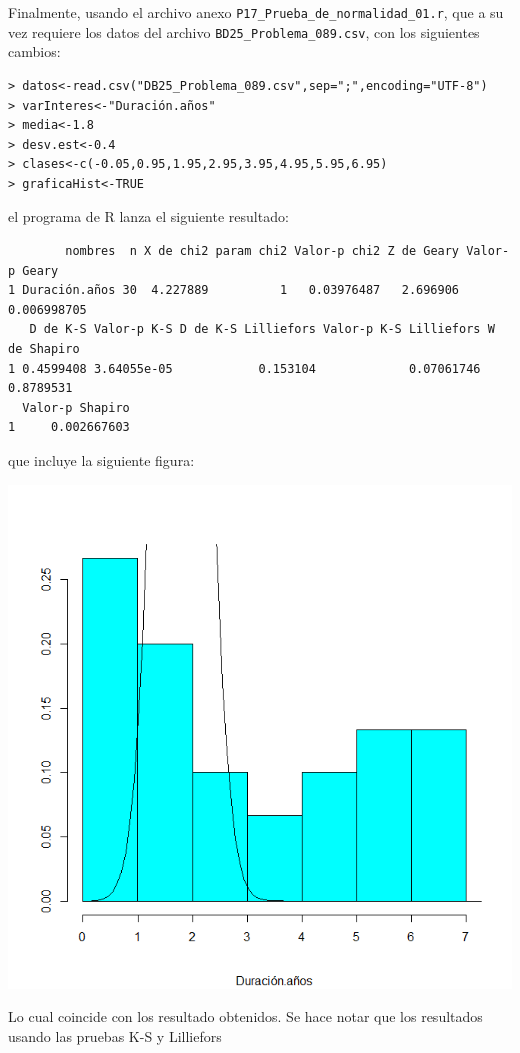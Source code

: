 \begin{solucion}
 Finalmente, usando el archivo anexo
 \texttt{P17\_Prueba\_de\_normalidad\_01.r},
 que a su vez requiere los datos del archivo \texttt{BD25\_Problema\_089.csv},
 con los siguientes cambios:
 \begin{verbatim}
> datos<-read.csv("DB25_Problema_089.csv",sep=";",encoding="UTF-8")
> varInteres<-"Duración.años"
> media<-1.8
> desv.est<-0.4
> clases<-c(-0.05,0.95,1.95,2.95,3.95,4.95,5.95,6.95)
> graficaHist<-TRUE
 \end{verbatim}
 \vspace{-0.5cm}
 el programa de R lanza el siguiente resultado:
 \begin{verbatim}
        nombres  n X de chi2 param chi2 Valor-p chi2 Z de Geary Valor-p Geary
1 Duración.años 30  4.227889          1   0.03976487   2.696906   0.006998705
   D de K-S Valor-p K-S D de K-S Lilliefors Valor-p K-S Lilliefors W de Shapiro
1 0.4599408 3.64055e-05            0.153104             0.07061746    0.8789531
  Valor-p Shapiro
1     0.002667603
 \end{verbatim}
 \vspace{-0.5cm}
 que incluye la siguiente figura:
 \begin{center}
  \includegraphics[scale=0.35]{Problema_89.png}
 \end{center}
 Lo cual coincide con los resultado obtenidos.
 Se hace notar que los resultados usando las pruebas K-S y Lilliefors

\end{solucion}
